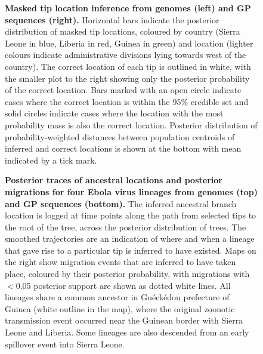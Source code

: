 \documentclass{bmcart}
\def\texttt{[image: ]}
\begin{document}
\begin{backmatter}
\begin{figure}[h]
 \centering
	\caption{\textbf{Masked tip location inference from genomes (left) and GP sequences (right).}
  Horizontal bars indicate the posterior distribution of masked tip locations, coloured by country (Sierra Leone in blue, Liberia in red, Guinea in green) and location (lighter colours indicate administrative divisions lying towards west of the country).
  The correct location of each tip is outlined in white, with the smaller plot to the right showing only the posterior probability of the correct location.
  Bars marked with an open circle indicate cases where the correct location is within the 95\% credible set and solid circles indicate cases where the location with the most probability mass is also the correct location.
  Posterior distribution of probability-weighted distances between population centroids of inferred and correct locations is shown at the bottom with mean indicated by a tick mark.
	}
	\label{locations}
\end{figure}

\begin{figure}[h]
 \centering
  \caption{\textbf{Posterior traces of ancestral locations and posterior migrations for four Ebola virus lineages from genomes (top) and GP sequences (bottom).}
  The inferred ancestral branch location is logged at time points along the path from selected tips to the root of the tree, across the posterior distribution of trees.
  The smoothed trajectories are an indication of where and when a lineage that gave rise to a particular tip is inferred to have existed.
  Maps on the right show migration events that are inferred to have taken place, coloured by their posterior probability, with migrations with $<$0.05 posterior support are shown as dotted white lines.
  All lineages share a common ancestor in Gu\'{e}ck\'{e}dou prefecture of Guinea (white outline in the map), where the original zoonotic transmission event occurred near the Guinean border with Sierra Leone and Liberia.
  Some lineages are also descended from an early spillover event into Sierra Leone.
  }
	\label{trace}
\end{figure}




\end{backmatter}
\end{document}
